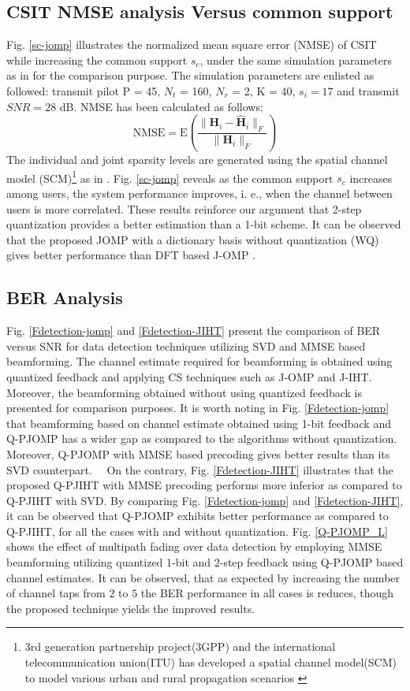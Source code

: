 \subsection{CSIT NMSE analysis Versus common support}
 Fig. \ref{sc-jomp} illustrates the normalized mean square error (NMSE) of CSIT while increasing the common support $s_c$, under the same simulation parameters as in \cite{mainref-joint} for the comparison purpose. The simulation parameters are enlisted as followed: transmit pilot P = 45,
$N_t$ = 160, $N_r$ = 2, K = 40, $s_i = 17$ and transmit $SNR = 28$ dB.
NMSE has been calculated as follows:
\begin{equation}
    \text{NMSE} =\text{E}  \left(\frac{\|\mathbf{H}_i-\mathbf{\hat{H}}_i\|_F}{\|\mathbf{H}_i\|_F} \right)
\end{equation}
The individual and joint sparsity levels are generated using the spatial channel model (SCM)\footnote{3rd generation partnership project(3GPP) and the international telecommunication union(ITU) has developed a spatial channel model(SCM) to model various urban and rural propagation scenarios \cite{SCM}} as in \cite{mainref-1bit,mainref-joint}. Fig. \ref{sc-jomp} reveals as the common support $s_c$ increases among users, the system performance improves, i. e., when the channel between users is more correlated.  These results reinforce our argument that 2-step quantization provides a better estimation than a 1-bit scheme.  It can be observed that the proposed JOMP with a dictionary basis without quantization (WQ) gives better performance than DFT based J-OMP \cite{mainref-joint}.
\subsection{ BER Analysis}
Fig. \ref{Fdetection-jomp} and \ref{Fdetection-JIHT} present the comparison of BER  versus SNR for data detection techniques utilizing SVD and MMSE based beamforming. The channel estimate required for beamforming is obtained using quantized feedback and applying CS techniques such as J-OMP and J-IHT. Moreover, the beamforming obtained without using quantized feedback is presented for comparison purposes.  It is worth noting in Fig. \ref{Fdetection-jomp} that beamforming based on channel estimate obtained using 1-bit feedback and Q-PJOMP has a wider gap as compared to the algorithms without quantization. Moreover, Q-PJOMP with MMSE based precoding gives better results than its SVD counterpart.  \ \
On the contrary, Fig. \ref{Fdetection-JIHT} illustrates that the proposed Q-PJIHT with MMSE precoding performs more inferior as compared to Q-PJIHT with SVD.   By comparing Fig. \ref{Fdetection-jomp} and \ref{Fdetection-JIHT}, it can be observed that Q-PJOMP exhibits better performance as compared to Q-PJIHT, for all the cases with and without quantization. Fig. \ref{Q-PJOMP_L} shows the effect of multipath fading over data detection by employing MMSE beamforming utilizing quantized 1-bit and 2-step feedback using Q-PJOMP based channel estimates.  It can be observed, that as expected by increasing the number of channel taps from $2$ to $5$ the BER performance in all cases is reduces, though the proposed technique yields the improved results.
